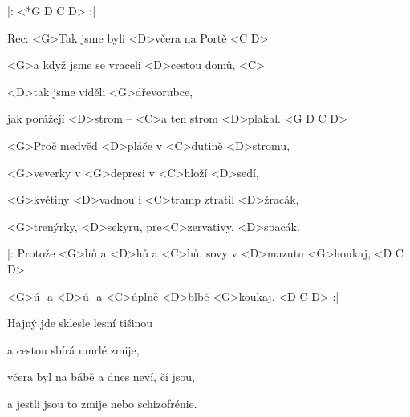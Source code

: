 

|: <*G D C D> :|

Rec: <G>Tak jsme byli <D>včera na Portě <C D>

<G>a když jsme se vraceli <D>cestou domů, <C>

<D>tak jsme viděli <G>dřevorubce,

jak porážejí <D>strom -- <C>a ten strom <D>plakal. <G D C D>

\zs
<G>Proč medvěd <D>pláče v <C>dutině <D>stromu,

<G>veverky v <G>depresi v <C>hloží <D>sedí,

<G>květiny <D>vadnou i <C>tramp ztratil <D>žracák,

<G>trenýrky, <D>sekyru, pre<C>zervativy, <D>spacák.
\ks

\zr
|: Protože <G>hů a <D>hů a <C>hů, sovy v <D>mazutu <G>houkaj, <D C D>

<G>ú- a <D>ú- a <C>úplně <D>blbě <G>koukaj. <D C D> :|
\kr

\zs
Hajný jde sklesle lesní tišinou

a cestou sbírá umrlé zmije,

včera byl na bábě a dnes neví, čí jsou,

a jestli jsou to zmije nebo schizofrénie.
\ks

\zr \kr

\kp
